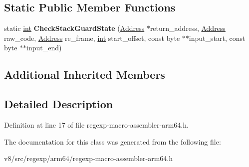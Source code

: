 \subsection*{Static Public Member Functions}
\begin{DoxyCompactItemize}
\item 
\mbox{\label{classv8_1_1internal_1_1RegExpMacroAssemblerARM64_a42e5d906474249e5dd274049c2a45c43}} 
static \mbox{\hyperlink{classint}{int}} {\bfseries Check\+Stack\+Guard\+State} (\mbox{\hyperlink{classuintptr__t}{Address}} $\ast$return\+\_\+address, \mbox{\hyperlink{classuintptr__t}{Address}} raw\+\_\+code, \mbox{\hyperlink{classuintptr__t}{Address}} re\+\_\+frame, \mbox{\hyperlink{classint}{int}} start\+\_\+offset, const byte $\ast$$\ast$input\+\_\+start, const byte $\ast$$\ast$input\+\_\+end)
\end{DoxyCompactItemize}
\subsection*{Additional Inherited Members}


\subsection{Detailed Description}


Definition at line 17 of file regexp-\/macro-\/assembler-\/arm64.\+h.



The documentation for this class was generated from the following file\+:\begin{DoxyCompactItemize}
\item 
v8/src/regexp/arm64/regexp-\/macro-\/assembler-\/arm64.\+h\end{DoxyCompactItemize}
